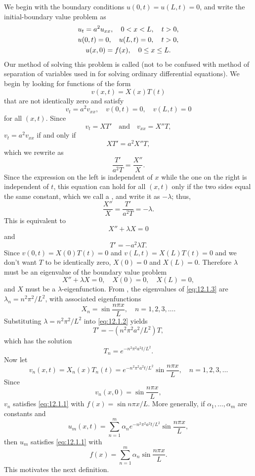 We begin with the boundary conditions $u(0,t)=u(L,t)=0$,
and write the initial-boundary value problem as
\begin{gather}
u_t=a^2u_{xx},\quad 0<x<L,\quad t>0,\notag\\
u(0,t)=0,\quad u(L,t)=0,\quad t>0,\label{eq:12.1.1}\\
u(x,0)=f(x),\quad 0\le x\le L.\notag
\end{gather}
Our method of solving this problem is called
(not to be confused with method of separation of
variables used in  for solving ordinary
differential equations).
We begin by looking for functions of the form
\[
v(x,t)=X(x)T(t)
\]
that are not identically zero and satisfy
\[
v_t=a^2v_{xx},\quad
v(0,t)=0,\quad v(L,t)=0
\]
for all $(x,t)$.
Since
\[
v_t=XT'\quad\text{and}\quad v_{xx}=X''T,
\]
$v_t=a^2v_{xx}$ if and only if
\[
XT'=a^2X''T,
\]
which we rewrite as
\[
\frac{T'}{a^2T}=\frac{X''}{X}.
\]
Since the expression on the left is independent of $x$ while
the one on the right is independent of $t$, this equation
can  hold  for all $(x,t)$ only if
 the two sides  equal the same constant, which
we  call  a , and write it
 as $-\lambda$;
 thus,
\[
\frac{X''}{X}=\frac{T'}{a^2T}=-\lambda.
\]
This is equivalent to
\[
X''+\lambda X=0
\]
and
\begin{equation} \label{eq:12.1.2}
T'=-a^2\lambda T.
\end{equation}
Since $v(0,t)=X(0)T(t)=0$ and $v(L,t)=X(L)T(t)=0$ and we don't
want $T$  to be identically  zero,
 $X(0)=0$ and $X(L)=0$. Therefore $\lambda$ must be an
eigenvalue of the boundary value problem
\begin{equation} \label{eq:12.1.3}
X''+\lambda X=0,\quad X(0)=0,\quad X(L)=0,
\end{equation}
and $X$ must be a $\lambda$-eigenfunction.
 From , the eigenvalues of \eqref{eq:12.1.3}
are $\lambda_n=n^2\pi^2/L^2$, with
associated eigenfunctions
\[
X_n=\sin\frac{n\pi x}{L}, \quad n=1,2,3,\dots.
\]
Substituting $\lambda=n^2\pi^2/L^2$  into
\eqref{eq:12.1.2} yields
\[
T'=-(n^2\pi^2a^2/L^2)T,
\]
which has the solution
\[
 T_n=e^{-n^2\pi^2a^2t/L^2}.
\]
Now let
\[
v_n(x,t)=X_n(x)T_n(t)=e^{-n^2\pi^2a^2t/L^2}\sin\frac{n\pi x}{L},\quad
n=1,2,3,\dots
\]
Since
\[
v_n(x,0)=\sin\frac{n\pi x}{L},
\]
 $v_n$ satisfies \eqref{eq:12.1.1} with $f(x)=\sin n\pi
x/L$.
More generally, if $\alpha_1,\dots,\alpha_m$ are constants and
\[
u_m(x,t)=
\sum_{n=1}^m \alpha_ne^{-n^2\pi^2a^2t/L^2}\sin\frac{n\pi x}{L},
\]
then $u_m$ satisfies \eqref{eq:12.1.1} with
\[
f(x)=\sum_{n=1}^m \alpha_n\sin\frac{n\pi x}{L}.
\]
This motivates the next definition.


